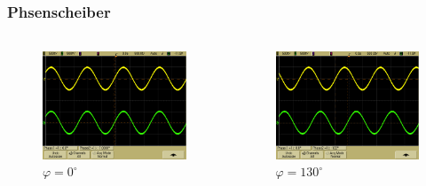 \begin{frame}
\frametitle{Phsenscheiber}
\framesubtitle{}
    \begin{columns}[c]
         \begin{figure}[H]
         \begin{center}
                 \includegraphics[scale=0.15]{./img/oszi/scope_0.png}
         \end{center}
         \caption{$\varphi = 0 ^{\circ}$}
         \end{figure}
         \begin{figure}[H]
         \begin{center}
                 \includegraphics[scale=0.15]{./img/oszi/scope_5.png}
         \end{center}
         \caption{$\varphi= 130 ^{\circ}$}
         \end{figure}
    \end{columns}
\end{frame}

